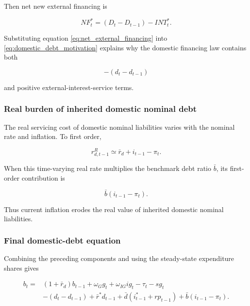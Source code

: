 Then net new external financing is

\begin{equation}
NF_t^{*}
=
(D_t-D_{t-1})-INT_t^{*}.
\label{eq:net_external_financing}
\end{equation}

Substituting equation \eqref{eq:net_external_financing} into
\eqref{eq:domestic_debt_motivation} explains why the domestic financing law
contains both

\[
-(d_t-d_{t-1})
\]

and positive external-interest-service terms.

\subsubsection{Real burden of inherited domestic nominal debt}

The real servicing cost of domestic nominal liabilities varies with the
nominal rate and inflation. To first order,

\begin{equation}
r_{d,t-1}^R
\simeq
\bar r_d
+
i_{t-1}
-
\pi_t.
\end{equation}

When this time-varying real rate multiplies the benchmark debt ratio \(\bar b\),
its first-order contribution is

\begin{equation}
\bar b(i_{t-1}-\pi_t).
\end{equation}

Thus current inflation erodes the real value of inherited domestic nominal
liabilities.

\subsubsection{Final domestic-debt equation}

Combining the preceding components and using the steady-state expenditure
shares gives

\begin{equation}
\boxed{
\begin{aligned}
b_t
={}&
(1+\bar r_d)b_{t-1}
+
\omega_Gg_t
+
\omega_{IG}ig_t
-
\tau_t
-
sg_t
\\
&-
(d_t-d_{t-1})
+
\bar r^{*}d_{t-1}
+
\bar d
\left(
i_{t-1}^{*}+rp_{t-1}
\right)
+
\bar b
\left(
i_{t-1}-\pi_t
\right).
\end{aligned}
}
\label{eq:b_final}
\end{equation}

